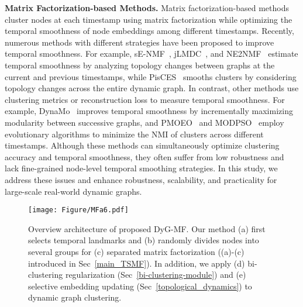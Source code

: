 \noindent \textbf{Matrix Factorization-based Methods.} 
Matrix factorization-based methods cluster nodes at each timestamp using matrix factorization while optimizing the temporal smoothness of node embeddings among different timestamps. 
Recently, numerous methods with different strategies have been proposed to improve temporal smoothness. 
For example, sE-NMF~\cite{Ma17b}, jLMDC~\cite{9531337}, and NE2NMF~\cite{DBLP:journals/kbs/LiZDGM21} estimate temporal smoothness by analyzing topology changes between graphs at the current and previous timestamps, while PisCES~\cite{LiuF1801} smooths clusters by considering topology changes across the entire dynamic graph. 
In contrast, other methods use clustering metrics or reconstruction loss to measure temporal smoothness. For example, DynaMo~\cite{DBLP:journals/tkde/ZhuangCL21} improves temporal smoothness by incrementally maximizing modularity between successive graphs, and PMOEO~\cite{DBLP:journals/kbs/ShenYTG22} and MODPSO~\cite{DBLP:journals/isci/YinZLD21} employ evolutionary algorithms to minimize the NMI of clusters across different timestamps. %
Although these methods can simultaneously optimize clustering accuracy and temporal smoothness, they often suffer from low robustness and lack fine-grained node-level temporal smoothing strategies. In this study, we address these issues and enhance robustness, scalability, and practicality for large-scale real-world dynamic graphs. 

%

\begin{figure*}[t]
\centering
\texttt{[image: Figure/MFa6.pdf]}
\caption{Overview architecture of proposed DyG-MF. 
Our method (a) first selects temporal landmarks and (b) randomly divides nodes into several groups for (c) separated matrix factorization ((a)-(c) introduced in Sec~{\ref{main_TSMF}}). 
In addition, we apply (d) bi-clustering regularization (Sec~{\ref{bi-clustering-module}})
and (e) selective embedding updating (Sec~{\ref{topological_dynamics}}) to dynamic graph clustering. 
}\label{figure:illustrate_smftii2}
\end{figure*}